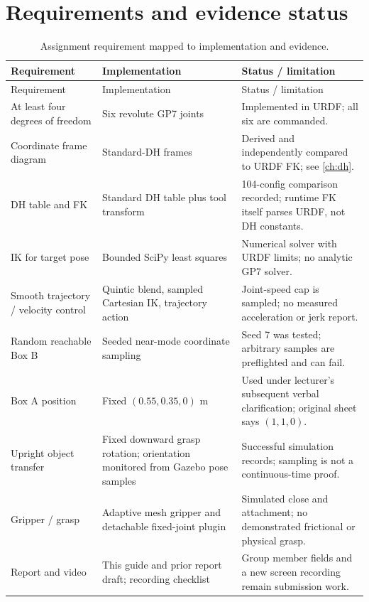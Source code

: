 \section{Requirements and evidence status}
\begin{longtable}{p{}p{}p{}}
\caption{Assignment requirement mapped to implementation and evidence.}\label{tab:req-map}\\
\toprule Requirement & Implementation & Status / limitation\\\midrule\endfirsthead
\toprule Requirement & Implementation & Status / limitation\\\midrule\endhead
At least four degrees of freedom & Six revolute GP7 joints & Implemented in URDF; all six are commanded.\\
Coordinate frame diagram & Standard-DH frames & Derived and independently compared to URDF FK; see \cref{ch:dh}.\\
DH table and FK & Standard DH table plus tool transform & 104-config comparison recorded; runtime FK itself parses URDF, not DH constants.\\
IK for target pose & Bounded SciPy least squares & Numerical solver with URDF limits; no analytic GP7 solver.\\
Smooth trajectory / velocity control & Quintic blend, sampled Cartesian IK, trajectory action & Joint-speed cap is sampled; no measured acceleration or jerk report.\\
Random reachable Box B & Seeded near-mode coordinate sampling & Seed 7 was tested; arbitrary samples are preflighted and can fail.\\
Box A position & Fixed $(0.55,0.35,0)$ m & Used under lecturer's subsequent verbal clarification; original sheet says $(1,1,0)$.\\
Upright object transfer & Fixed downward grasp rotation; orientation monitored from Gazebo pose samples & Successful simulation records; sampling is not a continuous-time proof.\\
Gripper / grasp & Adaptive mesh gripper and detachable fixed-joint plugin & Simulated close and attachment; no demonstrated frictional or physical grasp.\\
Report and video & This guide and prior report draft; recording checklist & Group member fields and a new screen recording remain submission work.\\
\bottomrule
\end{longtable}

